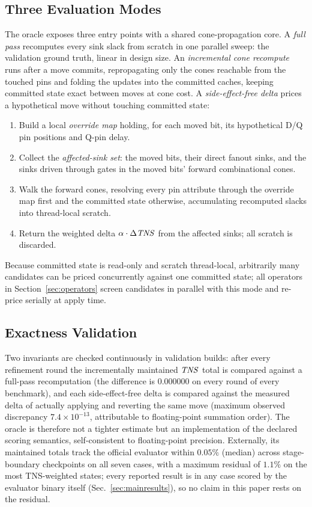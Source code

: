 \subsection{Three Evaluation Modes}
\label{sec:oracle:modes}

The oracle exposes three entry points with a shared cone-propagation core. A \emph{full pass} recomputes every sink slack from scratch in one parallel sweep: the validation ground truth, linear in design size. An \emph{incremental cone recompute} runs after a move commits, repropagating only the cones reachable from the touched pins and folding the updates into the committed caches, keeping committed state exact between moves at cone cost. A \emph{side-effect-free delta} prices a hypothetical move without touching committed state:
\begin{enumerate}
  \item Build a local \emph{override map} holding, for each moved bit, its hypothetical D/Q pin positions and Q-pin delay.
  \item Collect the \emph{affected-sink set}: the moved bits, their direct fanout sinks, and the sinks driven through gates in the moved bits' forward combinational cones.
  \item Walk the forward cones, resolving every pin attribute through the override map first and the committed state otherwise, accumulating recomputed slacks into thread-local scratch.
  \item Return the weighted delta $\alpha\cdot\Delta\mathit{TNS}$ from the affected sinks; all scratch is discarded.
\end{enumerate}
Because committed state is read-only and scratch thread-local, arbitrarily many candidates can be priced concurrently against one committed state; all operators in Section~\ref{sec:operators} screen candidates in parallel with this mode and re-price serially at apply time.

\subsection{Exactness Validation}
\label{sec:oracle:validation}

Two invariants are checked continuously in validation builds: after every refinement round the incrementally maintained $\mathit{TNS}$ total is compared against a full-pass recomputation (the difference is $0.000000$ on every round of every benchmark), and each side-effect-free delta is compared against the measured delta of actually applying and reverting the same move (maximum observed discrepancy $7.4\times10^{-13}$, attributable to floating-point summation order). The oracle is therefore not a tighter estimate but an implementation of the declared scoring semantics, self-consistent to floating-point precision. Externally, its maintained totals track the official evaluator within $0.05\%$ (median) across stage-boundary checkpoints on all seven cases, with a maximum residual of $1.1\%$ on the most TNS-weighted states; every reported result is in any case scored by the evaluator binary itself (Sec.~\ref{sec:mainresults}), so no claim in this paper rests on the residual.

